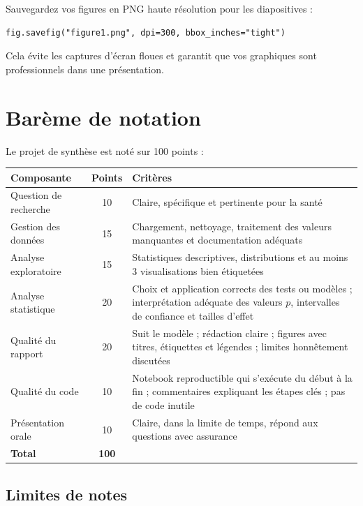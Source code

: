 \begin{pythontip}
Sauvegardez vos figures en PNG haute r\'esolution pour les diapositives :
\begin{verbatim}
fig.savefig("figure1.png", dpi=300, bbox_inches="tight")
\end{verbatim}
Cela \'evite les captures d'\'ecran floues et garantit que vos graphiques sont professionnels dans une pr\'esentation.
\end{pythontip}

\section{Bar\`eme de notation}

Le projet de synth\`ese est not\'e sur 100 points :

\begin{center}
\begin{tabular}{lcp{8cm}}
\toprule
\textbf{Composante} & \textbf{Points} & \textbf{Crit\`eres} \\
\midrule
Question de recherche & 10 & Claire, sp\'ecifique et pertinente pour la sant\'e \\
Gestion des donn\'ees & 15 & Chargement, nettoyage, traitement des valeurs manquantes et documentation ad\'equats \\
Analyse exploratoire & 15 & Statistiques descriptives, distributions et au moins 3 visualisations bien \'etiquet\'ees \\
Analyse statistique & 20 & Choix et application corrects des tests ou mod\`eles ; interpr\'etation ad\'equate des valeurs $p$, intervalles de confiance et tailles d'effet \\
Qualit\'e du rapport & 20 & Suit le mod\`ele ; r\'edaction claire ; figures avec titres, \'etiquettes et l\'egendes ; limites honn\^etement discut\'ees \\
Qualit\'e du code & 10 & Notebook reproductible qui s'ex\'ecute du d\'ebut \`a la fin ; commentaires expliquant les \'etapes cl\'es ; pas de code inutile \\
Pr\'esentation orale & 10 & Claire, dans la limite de temps, r\'epond aux questions avec assurance \\
\midrule
\textbf{Total} & \textbf{100} & \\
\bottomrule
\end{tabular}
\end{center}

\subsection{Limites de notes}

